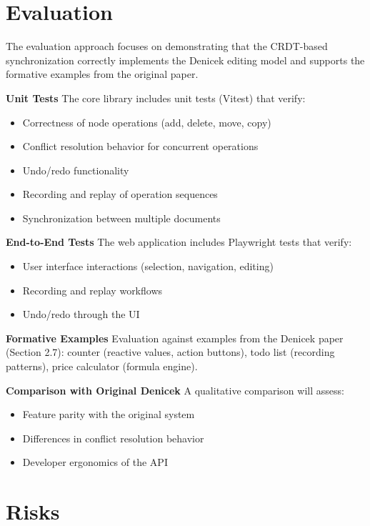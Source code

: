 \documentclass{article}
\begin{document}
\section{Evaluation}

The evaluation approach focuses on demonstrating that the CRDT-based synchronization correctly implements the Denicek editing model and supports the formative examples from the original paper.

\textbf{Unit Tests} The core library includes unit tests (Vitest) that verify:
\begin{itemize}
\setlength{\itemsep}{-5pt}
\item Correctness of node operations (add, delete, move, copy)
\item Conflict resolution behavior for concurrent operations
\item Undo/redo functionality
\item Recording and replay of operation sequences
\item Synchronization between multiple documents
\end{itemize}

\textbf{End-to-End Tests} The web application includes Playwright tests that verify:
\begin{itemize}
\setlength{\itemsep}{-5pt}
\item User interface interactions (selection, navigation, editing)
\item Recording and replay workflows
\item Undo/redo through the UI
\end{itemize}

\textbf{Formative Examples} Evaluation against examples from the Denicek paper (Section 2.7): counter (reactive values, action buttons), todo list (recording patterns), price calculator (formula engine).

\textbf{Comparison with Original Denicek} A qualitative comparison will assess:
\begin{itemize}
\setlength{\itemsep}{-5pt}
\item Feature parity with the original system
\item Differences in conflict resolution behavior
\item Developer ergonomics of the API
\end{itemize}


\section{Risks}
\end{document}
